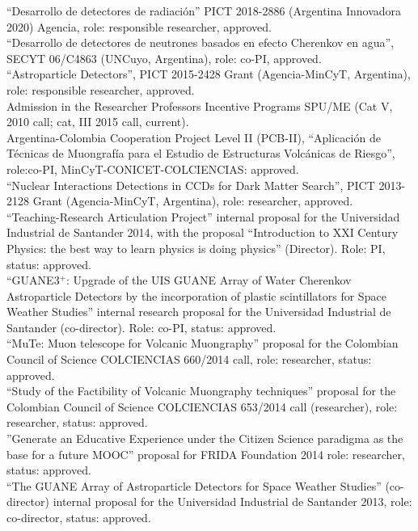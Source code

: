  ``Desarrollo de detectores de radiación'' PICT 2018-2886 (Argentina Innovadora 2020) Agencia, role: responsible researcher, approved.\\
 ``Desarrollo de detectores de neutrones basados en efecto Cherenkov en agua'', SECYT 06/C4863 (UNCuyo, Argentina), role: co-PI, approved.\\
 ``Astroparticle Detectors'', PICT 2015-2428 Grant (Agencia-MinCyT, Argentina), role: responsible researcher, approved.\\
 Admission in the Researcher Professors Incentive Programs SPU/ME (Cat V, 2010 call; cat, III 2015 call, current).\\
\ifres
\else
{} Argentina-Colombia Cooperation Project Level II (PCB-II), ``Aplicación de Técnicas de Muongrafía para el Estudio de Estructuras Volcánicas de Riesgo'', role:co-PI, MinCyT-CONICET-COLCIENCIAS: approved.\\
 ``Nuclear Interactions Detections in CCDs for Dark Matter Search'', PICT 2013-2128 Grant (Agencia-MinCyT, Argentina), role: researcher, approved.\\
 ``Teaching-Research Articulation Project'' internal proposal for the Universidad Industrial de Santander 2014, with the proposal ``Introduction to XXI Century Physics: the best way to learn physics is doing physics'' (Director). Role: PI, status: approved.\\
 ``GUANE3$^+$: Upgrade of the UIS GUANE Array of Water Cherenkov Astroparticle Detectors by the incorporation of plastic scintillators for Space Weather Studies'' internal research proposal for the Universidad Industrial de Santander (co-director). Role: co-PI, status: approved.\\
 ``MuTe: Muon telescope for Volcanic Muongraphy'' proposal for the Colombian Council of Science COLCIENCIAS 660/2014 call, role: researcher, status: approved.\\
 ``Study of the Factibility of Volcanic Muongraphy techniques'' proposal for the Colombian Council of Science COLCIENCIAS 653/2014 call (researcher), role: researcher, status: approved.\\
 ''Generate an Educative Experience under the Citizen Science paradigma as the base for a future MOOC'' proposal for FRIDA Foundation 2014 role: researcher, status: approved.\\
 ``The GUANE Array of Astroparticle Detectors for Space Weather Studies'' (co-director) internal proposal for the Universidad Industrial de Santander 2013, role: co-director, status: approved.\\
